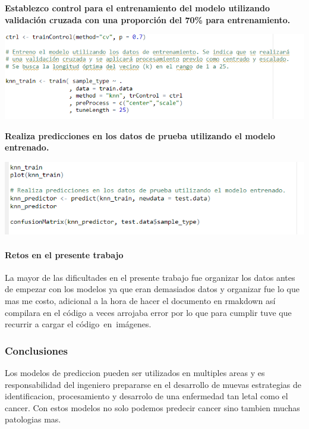 \documentclass[
]{article}
\begin{document}
\textbf{Establezco control para el entrenamiento del modelo utilizando
validación cruzada con una proporción del 70\% para entrenamiento.}

\includegraphics[width=5.72917in,height=\textheight]{images/knn3.png}

\textbf{Realiza predicciones en los datos de prueba utilizando el modelo
entrenado.}

\includegraphics[width=5.38542in,height=\textheight]{images/knn4.png}

\hypertarget{retos-en-el-presente-trabajo}{%
\paragraph{Retos en el presente
trabajo}\label{retos-en-el-presente-trabajo}}

La mayor de las dificultades en el presente trabajo fue organizar los
datos antes de empezar con los modelos ya que eran demasiados datos y
organizar fue lo que mas me costo, adicional a la hora de hacer el
documento en rmakdown así compilara en el código a veces arrojaba error
por lo que para cumplir tuve que recurrir a cargar el
código~en~imágenes.

\hypertarget{conclusiones}{%
\subsubsection{Conclusiones}\label{conclusiones}}

Los modelos de prediccion pueden ser utilizados en multiples areas y es
responsabilidad del ingeniero prepararse en el desarrollo de muevas
estrategias de identificacion, procesamiento y desarrolo de una
enfermedad tan letal como el cancer. Con estos modelos no solo podemos
predecir cancer sino tambien muchas patologias mas.
\end{document}
